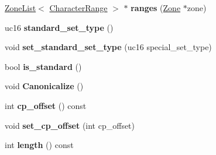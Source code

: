 \begin{DoxyCompactItemize}
\item 
\hyperlink{classv8_1_1internal_1_1_zone_list}{Zone\+List}$<$ \hyperlink{classv8_1_1internal_1_1_character_range}{Character\+Range} $>$ $\ast$ {\bfseries ranges} (\hyperlink{classv8_1_1internal_1_1_zone}{Zone} $\ast$zone)\hypertarget{classv8_1_1internal_1_1_b_a_s_e___e_m_b_e_d_d_e_d_a596bb69d5585e54384c968f6e19031fa}{}\label{classv8_1_1internal_1_1_b_a_s_e___e_m_b_e_d_d_e_d_a596bb69d5585e54384c968f6e19031fa}

\item 
uc16 {\bfseries standard\+\_\+set\+\_\+type} ()\hypertarget{classv8_1_1internal_1_1_b_a_s_e___e_m_b_e_d_d_e_d_ae554d0c2de362cf01f6ec7fd15e01de8}{}\label{classv8_1_1internal_1_1_b_a_s_e___e_m_b_e_d_d_e_d_ae554d0c2de362cf01f6ec7fd15e01de8}

\item 
void {\bfseries set\+\_\+standard\+\_\+set\+\_\+type} (uc16 special\+\_\+set\+\_\+type)\hypertarget{classv8_1_1internal_1_1_b_a_s_e___e_m_b_e_d_d_e_d_aa63d40d9b9ff2aacb2ed25a74637cd80}{}\label{classv8_1_1internal_1_1_b_a_s_e___e_m_b_e_d_d_e_d_aa63d40d9b9ff2aacb2ed25a74637cd80}

\item 
bool {\bfseries is\+\_\+standard} ()\hypertarget{classv8_1_1internal_1_1_b_a_s_e___e_m_b_e_d_d_e_d_aac0ac6f5e6ec2102d5cd4eba341014fd}{}\label{classv8_1_1internal_1_1_b_a_s_e___e_m_b_e_d_d_e_d_aac0ac6f5e6ec2102d5cd4eba341014fd}

\item 
void {\bfseries Canonicalize} ()\hypertarget{classv8_1_1internal_1_1_b_a_s_e___e_m_b_e_d_d_e_d_ac67b9a72bd93096d9393931cacf0a0fb}{}\label{classv8_1_1internal_1_1_b_a_s_e___e_m_b_e_d_d_e_d_ac67b9a72bd93096d9393931cacf0a0fb}

\item 
int {\bfseries cp\+\_\+offset} () const \hypertarget{classv8_1_1internal_1_1_b_a_s_e___e_m_b_e_d_d_e_d_a00b02644bc6a0ac7ac8613ec40f9fb31}{}\label{classv8_1_1internal_1_1_b_a_s_e___e_m_b_e_d_d_e_d_a00b02644bc6a0ac7ac8613ec40f9fb31}

\item 
void {\bfseries set\+\_\+cp\+\_\+offset} (int cp\+\_\+offset)\hypertarget{classv8_1_1internal_1_1_b_a_s_e___e_m_b_e_d_d_e_d_aa1dd41113aeb6669c6c57a8d217bb29f}{}\label{classv8_1_1internal_1_1_b_a_s_e___e_m_b_e_d_d_e_d_aa1dd41113aeb6669c6c57a8d217bb29f}

\item 
int {\bfseries length} () const \hypertarget{classv8_1_1internal_1_1_b_a_s_e___e_m_b_e_d_d_e_d_aa7027183c54054ccb6f2992d693e88bc}{}\label{classv8_1_1internal_1_1_b_a_s_e___e_m_b_e_d_d_e_d_aa7027183c54054ccb6f2992d693e88bc}


\end{DoxyCompactItemize}
